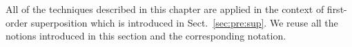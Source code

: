

All of the techniques described in this chapter are applied in the context of
first-order superposition which is introduced in Sect.~\ref{sec:pre:sup}. We
reuse all the notions introduced in this section and the corresponding notation. 
